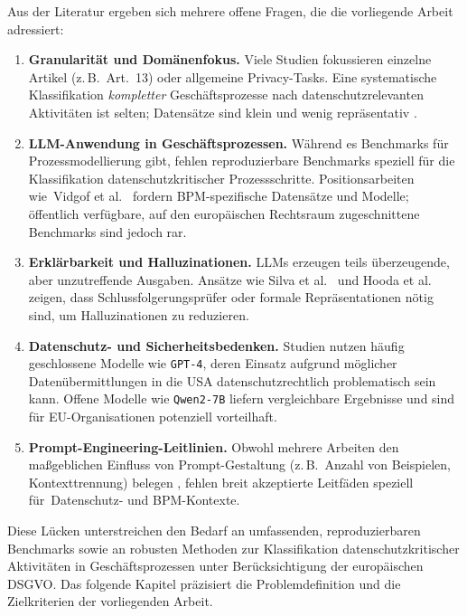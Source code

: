 Aus der Literatur ergeben sich mehrere offene Fragen, die die vorliegende Arbeit adressiert:
\begin{enumerate}
    \item \textbf{Granularität und Domänenfokus.} Viele Studien fokussieren einzelne Artikel (z.\,B.\ Art.~13) oder allgemeine Privacy-Tasks. Eine systematische Klassifikation \emph{kompletter} Geschäftsprozesse nach datenschutzrelevanten Aktivitäten ist selten; Datensätze sind klein und wenig repräsentativ \cite{nake2023towards}.
    \item \textbf{\ac{LLM}-Anwendung in Geschäftsprozessen.} Während es Benchmarks für Prozessmodellierung gibt, fehlen reproduzierbare Benchmarks speziell für die Klassifikation datenschutzkritischer Prozessschritte. Positionsarbeiten wie\linebreak~Vidgof et al.\ \cite{vidgof2023largelanguagemodelsbusiness} fordern \ac{BPM}-spezifische Datensätze und Modelle; öffentlich verfügbare, auf den europäischen Rechtsraum zugeschnittene Benchmarks sind jedoch rar.
    \item \textbf{Erklärbarkeit und Halluzinationen.} \acp{LLM} erzeugen teils überzeugende, aber unzutreffende Ausgaben. Ansätze wie Silva et al.\ \cite{silva2024entailment} und Hooda et al.\ \cite{hooda2024policylr} zeigen, dass Schlussfolgerungsprüfer oder formale Repräsentationen nötig sind, um Halluzinationen zu reduzieren.
    \item \textbf{Datenschutz- und Sicherheitsbedenken.} Studien nutzen häufig geschlossene Modelle wie \texttt{GPT-4}, deren Einsatz aufgrund möglicher Datenübermittlungen in die USA datenschutzrechtlich problematisch sein kann. Offene Modelle wie \texttt{Qwen2-7B} liefern vergleichbare Ergebnisse \cite{schwerin2024systematic} und sind für \ac{EU}-Organisationen potenziell vorteilhaft.
    \item \textbf{Prompt-Engineering-Leitlinien.} Obwohl mehrere Arbeiten den maßgeblichen Einfluss von Prompt-Gestaltung (z.\,B.\ Anzahl von Beispielen, Kontexttrennung) belegen \cite{pragyan2024toward,liu2023prompting}, fehlen breit akzeptierte Leitfäden speziell für\linebreak~Datenschutz- und \ac{BPM}-Kontexte.
\end{enumerate}

Diese Lücken unterstreichen den Bedarf an umfassenden, reproduzierbaren Benchmarks sowie an robusten Methoden zur Klassifikation datenschutzkritischer Aktivitäten in Geschäftsprozessen unter Berücksichtigung der europäischen \ac{DSGVO}. Das folgende Kapitel präzisiert die Problemdefinition und die Zielkriterien der vorliegenden Arbeit.
